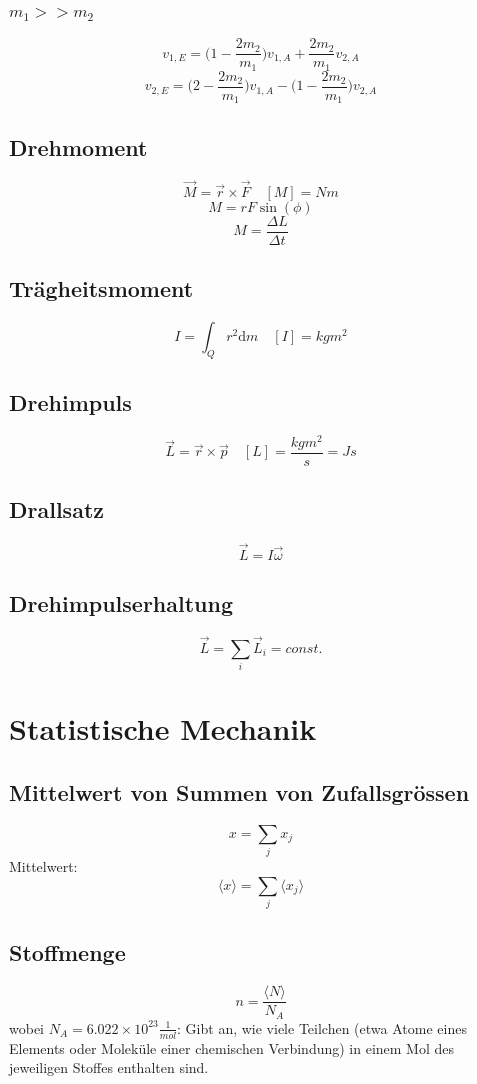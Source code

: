 \documentclass{article}
\begin{document}
\begin{multicols*}{3}
  \subsubsection{$m_1 >> m_2$}
  $$v_{1,E} = \big(1-\frac{2m_2}{m_1}\big)v_{1,A}+\frac{2m_2}{m_1}v_{2,A}$$
  $$v_{2,E} = \big(2-\frac{2m_2}{m_1}\big)v_{1,A}-\big(1- \frac{2m_2}{m_1}\big)v_{2,A}$$
  \subsection{Drehmoment}
  $$\vec{M} = \vec{r}\times \vec{F} \quad [M]= Nm$$
  $$M=rF\sin(\phi)$$
  $$M = \frac{\Delta L}{\Delta t}$$
  \subsection{Trägheitsmoment}

  $${\displaystyle I=\int _{Q}r^{2}\mathrm {d} m} \quad [I]=kgm^2$$

  \subsection{Drehimpuls}
  $$\vec{L}= \vec{r}\times \vec{p} \quad [L] = \frac{kgm^2}{s} = Js$$

  \subsection{Drallsatz}
  $$\vec{L}=I \vec{\omega}$$

  \subsection{Drehimpulserhaltung}

  $$\vec{L}= \sum_{i} \vec{L}_i = const.$$

  \section{Statistische Mechanik}
  \subsection{Mittelwert von Summen von Zufallsgrössen}
  $$x= \sum_j x_j$$
  Mittelwert:
  $$\langle x\rangle = \sum_j \langle x_j\rangle$$

  \subsection{Stoffmenge}
  $$n = \frac{\langle N\rangle}{N_A}$$
  wobei $N_A = 6.022 \times 10 ^{23} \frac{1}{mol}$: Gibt an, wie viele Teilchen (etwa Atome eines Elements oder Moleküle einer chemischen Verbindung) in einem Mol des jeweiligen Stoffes enthalten sind.


\end{multicols*}
\end{document}
